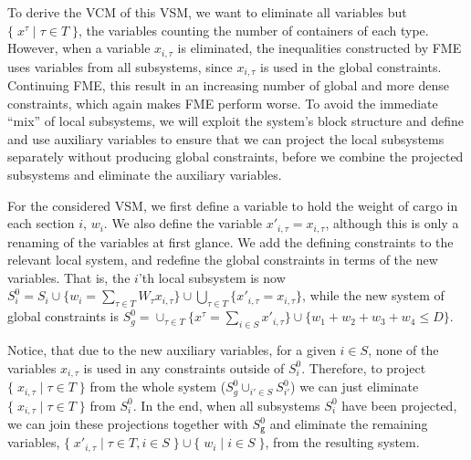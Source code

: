 \documentclass{llncs}
\newcommand{\trt}[1]{\texttt{#1}}
\newcommand{\set}[2]{\{\;{#1}\;|\;{#2}\;\}}
\begin{document}
To derive the VCM of this VSM, we want to eliminate all variables but $\set{x^\tau}{\tau\in T}$, the variables counting the number of containers of each type. However, when a variable $x_{i,\tau}$ is eliminated, the inequalities constructed by FME uses variables from all subsystems, since $x_{i,\tau}$ is used in the global constraints. Continuing FME, this result in an increasing number of global and more dense constraints, which again makes FME perform worse. 
To avoid the immediate ``mix'' of local subsystems, we will exploit the system's block structure and define and use auxiliary variables to ensure that we can project the local subsystems separately without producing global constraints, before we combine the projected subsystems and eliminate the auxiliary variables. 

For the considered VSM, we first define a variable to hold the weight of cargo in each section $i$, $w_i$. We also define the variable $x'_{i,\tau} = x_{i,\tau}$, although this is only a renaming of the variables at first glance. We add the defining constraints to the relevant local system, and redefine the global constraints in terms of the new variables. 
That is, the $i$'th local subsystem is now $S_i^0 = S_i \cup \{w_i = \sum_{\tau\in T} W_\tau x_{i,\tau}\} \cup \bigcup_{\tau\in T}\{x'_{i,\tau} = x_{i,\tau}\}$, while the new system of global constraints is $S_g^0 = \cup_{\tau\in T}\{x^\tau = \sum_{i\in S} x'_{i,\tau}\} \cup \{w_1 + w_2 + w_3 + w_4 \leq D\}$. 

Notice, that due to the new auxiliary variables, for a given $i\in S$, none of the variables $x_{i,\tau}$ is used in any constraints outside of $S^0_i$. Therefore, to project $\set{x_{i,\tau}}{\tau\in T}$ from the whole system ($S^0_g\cup_{i'\in S}S^0_{i'}$) we can just eliminate $\set{x_{i,\tau}}{\tau\in T}$ from $S_i^0$. In the end, when all subsystems $S^0_i$ have been projected, we can join these projections together with $S^0_\trt{g}$ and eliminate the remaining variables, $\set{x'_{i,\tau}}{\tau\in T, i\in S}\cup\set{w_i}{i\in S}$, from the resulting system.
\end{document}

